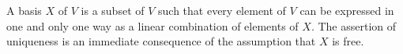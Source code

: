 A basis $X$ of $V$ is a subset of $V$ such that every element of $V$ can be expressed in one and only one way as a linear combination of elements of $X$. The assertion of uniqueness is an immediate consequence of the assumption that $X$ is free.
